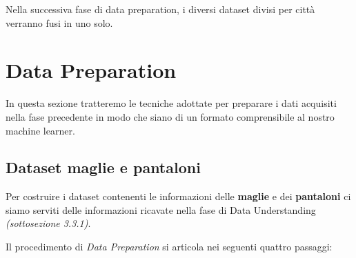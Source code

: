 \documentclass[a4paper, 11pt, oneside]{report}
\begin{document}
            Nella successiva fase di data preparation, i diversi dataset divisi per città verranno fusi in uno solo.

            \newpage
            \section{Data Preparation}
            In questa sezione tratteremo le tecniche adottate per preparare i dati acquisiti nella fase precedente in
            modo che siano di un formato comprensibile al nostro machine learner.
                \subsection{Dataset maglie e pantaloni}
                Per costruire i dataset contenenti le informazioni delle \textbf{maglie} e dei \textbf{pantaloni} ci siamo serviti delle
                informazioni ricavate nella fase di Data Understanding \textit{(sottosezione 3.3.1)}.
                \par \noindent Il procedimento di \textit{Data Preparation} si articola nei seguenti quattro passaggi:
\end{document}

